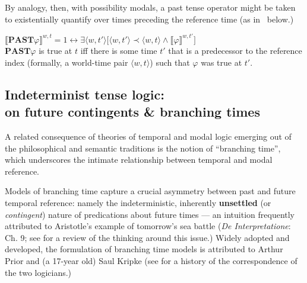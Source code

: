 \documentclass[12pt,dvipsnames]{report}
\providecommand{\denote}[2][]{\ensuremath{\llbracket{#2}\rrbracket^{#1}}}
\begin{document}
By analogy, then, with possibility modals, a past tense operator might be taken to existentially quantify over times preceding the reference time (as in \nextx~below.)

\pex $ \denote[w,t]{\mathbf{PAST}\varphi}=1\leftrightarrow\exists \langle{w,t'}\rangle\big[\langle{w,t'}\rangle\prec \langle{w,t}\rangle\wedge \denote[w,t']{\varphi}\big]$\\
$ \mathbf{PAST}\varphi $ is true at $ t $ iff there is some time $ t' $ that is a predecessor to the reference index (formally, a world-time pair $ \langle w,t\rangle $) such that $ \varphi $ was true at $ t' $.\xe


\subsection[Indeterminist tense logic]{Indeterminist tense logic:\\on future contingents \& branching times}\label{BT-review} A related consequence of theories of temporal and modal logic emerging out of the philosophical and semantic traditions is the notion of ``branching time'', which underscores the intimate relationship between temporal and modal reference.  %


Models of branching time capture a crucial asymmetry between past and future temporal reference: namely the indeterministic, inherently \textbf{unsettled} (or \textit{contingent}) nature of predications about future times --- an intuition frequently attributed to Aristotle's example of tomorrow's sea battle (\textit{De Interpretatione}: Ch. 9; see \citealt{Øhrstrøm1995} for a review of the thinking around this issue.) Widely adopted and developed, the formulation of branching time models is attributed to Arthur Prior and (a 17-year old) Saul Kripke (see \citealt{Ploug2012} for a history of the correspondence of the two logicians.)
\end{document}
